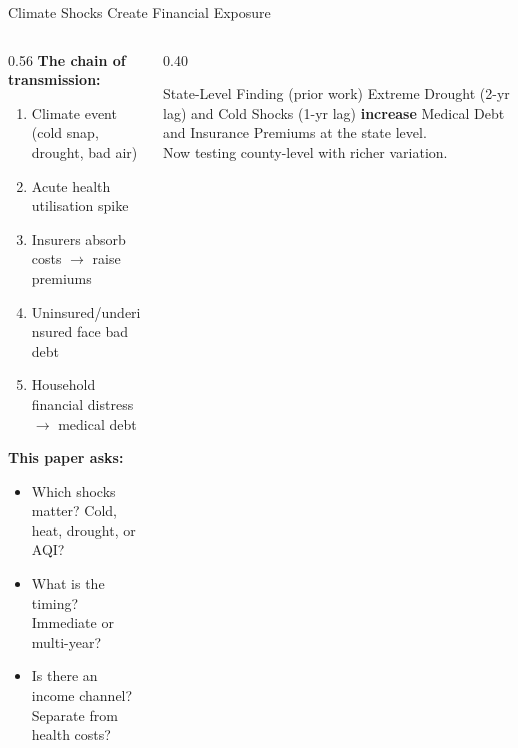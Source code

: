 \documentclass[aspectratio=169,11pt]{beamer}
\newcommand{\emphcolor}[1]{{\color{WarmOrange}\textbf{#1}}}
\newcommand{\tealtext}[1]{{\color{Teal}#1}}
\newcommand{\graytext}[1]{{\color{WarmGray}#1}}
\begin{document}
\begin{frame}{Climate Shocks Create Financial Exposure}
  \begin{columns}[T]
    \begin{column}{0.56\textwidth}
      \textbf{The chain of transmission:}
      \begin{enumerate}\itemsep0.2em
        \item Climate event (cold snap, drought, bad air)
        \item Acute health utilisation spike
        \item Insurers absorb costs \(\rightarrow\) raise premiums
        \item Uninsured/underinsured face bad debt
        \item Household financial distress \(\rightarrow\) medical debt
      \end{enumerate}
      \vspace{0.3em}
      \textbf{This paper asks:}
      \begin{itemize}\itemsep0.2em
        \item Which shocks matter? \tealtext{Cold, heat, drought, or AQI?}
        \item What is the timing? \tealtext{Immediate or multi-year?}
        \item Is there an income channel? \tealtext{Separate from health costs?}
      \end{itemize}
    \end{column}
    \begin{column}{0.40\textwidth}
      \begin{alertblock}{State-Level Finding (prior work)}
        Extreme Drought (2-yr lag) and Cold Shocks (1-yr lag) \emphcolor{increase} Medical Debt and Insurance Premiums at the state level.\\[0.5em]
        \graytext{\small Now testing county-level with richer variation.}
      \end{alertblock}
    \end{column}
  \end{columns}
\end{frame}
\end{document}
